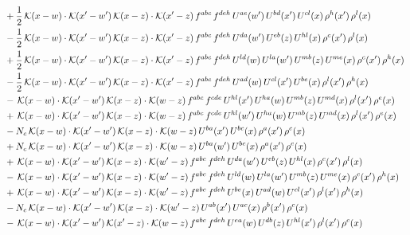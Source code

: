 \documentclass[9pt]{article}
\numberwithin{equation}{section}
\begin{document}
\begin{align}
& +\frac{1}{2}\,\mathcal{K}(x-w)\cdot\mathcal{K}(x'-w')\,\mathcal{K}(x-z)\cdot\mathcal{K}(x'-z)\,f^{abc}\,f^{deh}\,U^{ae}(w')\,U^{bd}(x')\,U^{cl}(x)\,\rho^{h}(x')\,\rho^{l}(x)\notag\\
& -\frac{1}{2}\,\mathcal{K}(x-w)\cdot\mathcal{K}(x'-w')\,\mathcal{K}(x-z)\cdot\mathcal{K}(x'-z)\,f^{abc}\,f^{deh}\,U^{da}(w')\,U^{eb}(z)\,U^{hl}(x)\,\rho^{c}(x')\,\rho^{l}(x)\notag\\
& +\frac{1}{2}\,\mathcal{K}(x-w)\cdot\mathcal{K}(x'-w')\,\mathcal{K}(x-z)\cdot\mathcal{K}(x'-z)\,f^{abc}\,f^{deh}\,U^{ld}(w)\,U^{la}(w')\,U^{mb}(z)\,U^{me}(x)\,\rho^{c}(x')\,\rho^{h}(x)\notag\\
& -\frac{1}{2}\,\mathcal{K}(x-w)\cdot\mathcal{K}(x'-w')\,\mathcal{K}(x-z)\cdot\mathcal{K}(x'-z)\,f^{abc}\,f^{deh}\,U^{ad}(w)\,U^{cl}(x')\,U^{be}(x)\,\rho^{l}(x')\,\rho^{h}(x)\notag\\
& -\,\mathcal{K}(x-w)\cdot\mathcal{K}(x'-w')\,\mathcal{K}(x-z)\cdot\mathcal{K}(w-z)\,f^{abc}\,f^{cde}\,U^{hl}(x')\,U^{ha}(w)\,U^{mb}(z)\,U^{md}(x)\,\rho^{l}(x')\,\rho^{e}(x)\notag\\
& +\,\mathcal{K}(x-w)\cdot\mathcal{K}(x'-w')\,\mathcal{K}(x-z)\cdot\mathcal{K}(w-z)\,f^{abc}\,f^{cde}\,U^{hl}(w')\,U^{ha}(w)\,U^{mb}(z)\,U^{md}(x)\,\rho^{l}(x')\,\rho^{e}(x)\notag\\
& -N_{c}\,\mathcal{K}(x-w)\cdot\mathcal{K}(x'-w')\,\mathcal{K}(x-z)\cdot\mathcal{K}(w-z)\,U^{ba}(x')\,U^{bc}(x)\,\rho^{a}(x')\,\rho^{c}(x)\notag\\
& +N_{c}\,\mathcal{K}(x-w)\cdot\mathcal{K}(x'-w')\,\mathcal{K}(x-z)\cdot\mathcal{K}(w-z)\,U^{ba}(w')\,U^{bc}(x)\,\rho^{a}(x')\,\rho^{c}(x)\notag\\
& +\,\mathcal{K}(x-w)\cdot\mathcal{K}(x'-w')\,\mathcal{K}(x-z)\cdot\mathcal{K}(w'-z)\,f^{abc}\,f^{deh}\,U^{da}(w')\,U^{eb}(z)\,U^{hl}(x)\,\rho^{c}(x')\,\rho^{l}(x)\notag\\
& -\,\mathcal{K}(x-w)\cdot\mathcal{K}(x'-w')\,\mathcal{K}(x-z)\cdot\mathcal{K}(w'-z)\,f^{abc}\,f^{deh}\,U^{ld}(w)\,U^{la}(w')\,U^{mb}(z)\,U^{me}(x)\,\rho^{c}(x')\,\rho^{h}(x)\notag\\
& +\,\mathcal{K}(x-w)\cdot\mathcal{K}(x'-w')\,\mathcal{K}(x-z)\cdot\mathcal{K}(w'-z)\,f^{abc}\,f^{deh}\,U^{be}(x)\,U^{ad}(w)\,U^{cl}(x')\,\rho^{l}(x')\,\rho^{h}(x)\notag\\
& -N_{c}\,\mathcal{K}(x-w)\cdot\mathcal{K}(x'-w')\,\mathcal{K}(x-z)\cdot\mathcal{K}(w'-z)\,U^{ab}(x')\,U^{ac}(x)\,\rho^{b}(x')\,\rho^{c}(x)\notag\\
& -\,\mathcal{K}(x-w)\cdot\mathcal{K}(x'-w')\,\mathcal{K}(x'-z)\cdot\mathcal{K}(w-z)\,f^{abc}\,f^{deh}\,U^{ea}(w)\,U^{db}(z)\,U^{hl}(x')\,\rho^{l}(x')\,\rho^{c}(x)\notag\\

\end{align}
\end{document}
